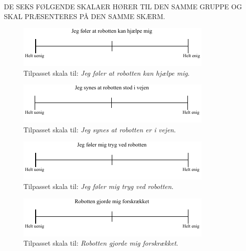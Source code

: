 \noindent
%   
DE SEKS FØLGENDE SKALAER HØRER TIL DEN SAMME GRUPPE OG SKAL PRÆSENTERES PÅ DEN SAMME SKÆRM.
%
\begin{figure}[H]
\centering
\includegraphics[width =\textwidth]{Figure/TilpasningAfSkalaer/TilpassetRobottenKanHjaelpe} 
\caption{Tilpasset skala til: \textit{Jeg føler at robotten kan hjælpe mig}.}
\label{fig:TilpasningRobottenKanHjaelpe}
\end{figure}
\noindent
% 
%
\begin{figure}[H]
\centering
\includegraphics[width =\textwidth]{Figure/TilpasningAfSkalaer/TilpassetRobottenErIVejen} 
\caption{Tilpasset skala til: \textit{Jeg synes at robotten er i vejen}.}
\label{fig:TilpasningRobottenErIVejen}
\end{figure}
\noindent
% 
%
\begin{figure}[H]
\centering
\includegraphics[width =\textwidth]{Figure/TilpasningAfSkalaer/TilpassetTrygVedR} 
\caption{Tilpasset skala til: \textit{Jeg føler mig tryg ved robotten}.}
\label{fig:TilpasningTrygVedR}
\end{figure}
\noindent
% 
%
\begin{figure}[H]
\centering
\includegraphics[width =\textwidth]{Figure/TilpasningAfSkalaer/TilpassetForskraekket} 
\caption{Tilpasset skala til: \textit{Robotten gjorde mig forskrækket}.}
\label{fig:TilpasningForskraekket}
\end{figure}
